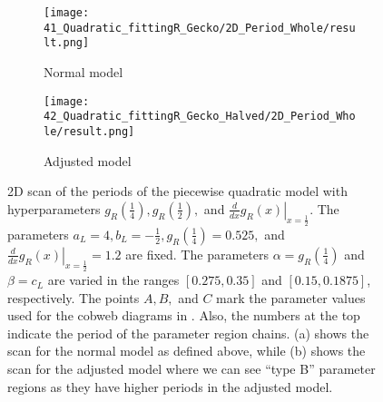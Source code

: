 \begin{figure}
	\centering
	\begin{subfigure}{0.4\textwidth}
		\centering
		\texttt{[image: 41\_Quadratic\_fittingR\_Gecko/2D\_Period\_Whole/result.png]}
		\caption{Normal model}
		\label{fig:setup.quad.hyper.2.period.full}
	\end{subfigure}
	\begin{subfigure}{0.4\textwidth}
		\centering
		\texttt{[image: 42\_Quadratic\_fittingR\_Gecko\_Halved/2D\_Period\_Whole/result.png]}
		\caption{Adjusted model}
		\label{fig:setup.quad.hyper.2.period.halved}
	\end{subfigure}
	\caption[2D scan of the periods of the quadratic model with hyperparameters for different values of the fixed parameters]{
	2D scan of the periods of the piecewise quadratic model with hyperparameters $g_R\left(\frac{1}{4}\right), g_R\left(\frac{1}{2}\right),$ and $\left. \frac{d}{dx} g_R\left(x\right) \right|_{x = \frac{1}{2}}$.
	The parameters $a_L = 4, b_L = -\frac{1}{2}, g_R\left(\frac{1}{4}\right) = 0.525,$ and $\left. \frac{d}{dx} g_R\left(x\right) \right|_{x = \frac{1}{2}} = 1.2$ are fixed.
	The parameters $\alpha = g_R\left(\frac{1}{4}\right)$ and $\beta = c_L$ are varied in the ranges $[0.275, 0.35]$ and $[0.15, 0.1875]$, respectively.
	The points $A, B,$ and $C$ mark the parameter values used for the cobweb diagrams in .
	Also, the numbers at the top indicate the period of the parameter region chains.
	(a) shows the scan for the normal model as defined above, while (b) shows the scan for the adjusted model where we can see ``type B'' parameter regions as they have higher periods in the adjusted model.
	}
	\label{fig:setup.quad.hyper.2.period}
\end{figure}

